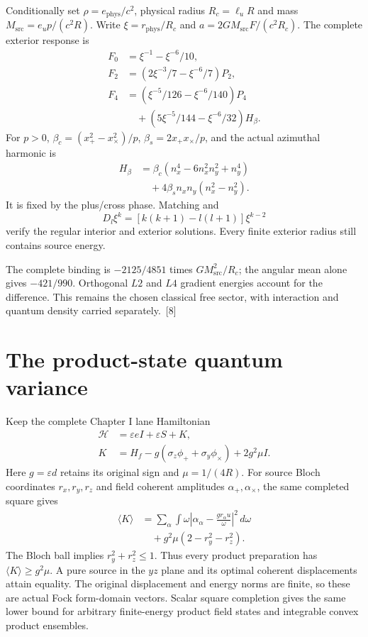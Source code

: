 \documentclass[10pt,twocolumn,letterpaper]{article}
\begin{document}
Conditionally set $\rho=e_{\mathrm{phys}}/c^2$, physical radius $R_c=\ell_uR$ and mass $M_{\mathrm{src}}=e_up/(c^2R)$. Write $\xi=r_{\mathrm{phys}}/R_c$ and $a=2GM_{\mathrm{src}}F/(c^2R_c)$. The complete exterior response is
\[
\begin{aligned}
F_0&=\xi^{-1}-\xi^{-6}/10,\\
F_2&=(2\xi^{-3}/7-\xi^{-6}/7)P_2,\\
F_4&=(\xi^{-5}/126-\xi^{-6}/140)P_4\\
&\quad +(5\xi^{-5}/144-\xi^{-6}/32)H_\beta.
\end{aligned}
\]
For $p>0$, $\beta_c=(x_+^2-x_\times^2)/p$, $\beta_s=2x_+x_\times/p$, and the actual azimuthal harmonic is
\[
\begin{aligned}
H_\beta&=\beta_c(n_x^4-6n_x^2n_y^2+n_y^4)\\
&\quad +4\beta_sn_xn_y(n_x^2-n_y^2).
\end{aligned}
\]
It is fixed by the plus/cross phase. Matching and
\[
D_l\xi^k=[k(k+1)-l(l+1)]\xi^{k-2}
\]
verify the regular interior and exterior solutions. Every finite exterior radius still contains source energy.

The complete binding is $-2125/4851$ times $GM_{\mathrm{src}}^2/R_c$; the angular mean alone gives $-421/990$. Orthogonal $L2$ and $L4$ gradient energies account for the difference. This remains the chosen classical free sector, with interaction and quantum density carried separately.~[8]

\section{The product-state quantum variance}
Keep the complete Chapter I lane Hamiltonian
\[
\begin{aligned}
\mathcal H&=\varepsilon eI+\varepsilon S+K,\\
K&=H_f-g(\sigma_z\phi_++\sigma_y\phi_\times)+2g^2\mu I.
\end{aligned}
\]
Here $g=\varepsilon d$ retains its original sign and $\mu=1/(4R)$. For source Bloch coordinates $r_x,r_y,r_z$ and field coherent amplitudes $\alpha_+,\alpha_\times$, the same completed square gives
\[
\begin{aligned}
\langle K\rangle&=\sum_\alpha\int\omega\left|\alpha_\alpha-\frac{gr_\alpha u}{\omega}\right|^2\,d\omega\\
&\quad +g^2\mu(2-r_y^2-r_z^2).
\end{aligned}
\]
The Bloch ball implies $r_y^2+r_z^2\leq1$. Thus every product preparation has $\langle K\rangle\geq g^2\mu$. A pure source in the $yz$ plane and its optimal coherent displacements attain equality. The original displacement and energy norms are finite, so these are actual Fock form-domain vectors. Scalar square completion gives the same lower bound for arbitrary finite-energy product field states and integrable convex product ensembles.
\end{document}
